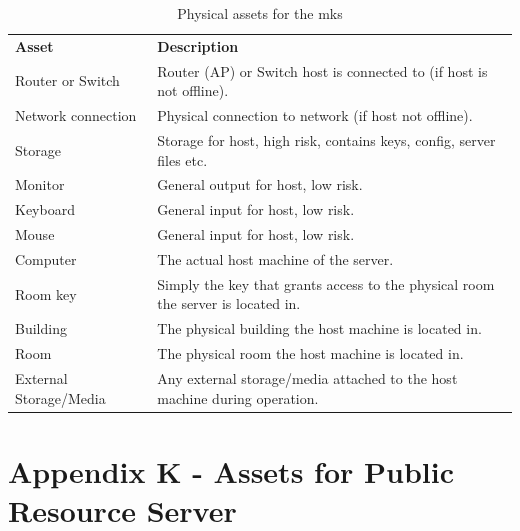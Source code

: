 \begin{appendices}
\begin{table}[htp]
  \begin{tabularx}{\linewidth}{lX}
    \textbf{Asset}          & \textbf{Description} \\
    Router or Switch        &	Router (AP) or Switch host is connected to (if host is not offline). \\
    Network connection      &	Physical connection to network (if host not offline). \\
    Storage                 &	Storage for host, high risk, contains keys, config, server files etc. \\
    Monitor                 &	General output for host, low risk. \\
    Keyboard                &	General input for host, low risk. \\
    Mouse                   &	General input for host, low risk. \\
    Computer                &	The actual host machine of the server. \\
    Room key                &	Simply the key that grants access to the physical room the server is located in. \\
    Building                &	The physical building the host machine is located in. \\
    Room                    &	The physical room the host machine is located in. \\
    External Storage/Media  &	Any external storage/media attached to the host machine during operation. \\
  \end{tabularx}
  \caption{Physical assets for the \acrfull{mks}}
  \label{tab:physical_assets_mk}
\end{table}

\section{Appendix K - Assets for Public Resource Server}
\label{appendix:prs_assets}


\end{appendices}
